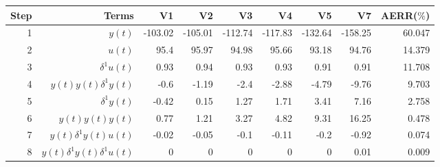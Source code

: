 \begin{tabular}{rrrrrrrrr}
Step & Terms & V1 & V2 & V3 & V4 & V5 & V7 & AERR($\%$) \\ 
\hline 
1 & $y(t)$ & -103.02 & -105.01 & -112.74 & -117.83 & -132.64 & -158.25 & 60.047 \\ 
2 & $u(t)$ & 95.4 & 95.97 & 94.98 & 95.66 & 93.18 & 94.76 & 14.379 \\ 
3 & $\delta^1 u(t)$ & 0.93 & 0.94 & 0.93 & 0.93 & 0.91 & 0.91 & 11.708 \\ 
4 & $y(t)y(t)\delta^1 y(t)$ & -0.6 & -1.19 & -2.4 & -2.88 & -4.79 & -9.76 & 9.703 \\ 
5 & $\delta^1 y(t)$ & -0.42 & 0.15 & 1.27 & 1.71 & 3.41 & 7.16 & 2.758 \\ 
6 & $y(t)y(t)y(t)$ & 0.77 & 1.21 & 3.27 & 4.82 & 9.31 & 16.25 & 0.478 \\ 
7 & $y(t)\delta^1 y(t)u(t)$ & -0.02 & -0.05 & -0.1 & -0.11 & -0.2 & -0.92 & 0.074 \\ 
8 & $y(t)\delta^1 y(t)\delta^1 u(t)$ & 0 & 0 & 0 & 0 & 0 & 0.01 & 0.009 \\ 
\hline 
\end{tabular}